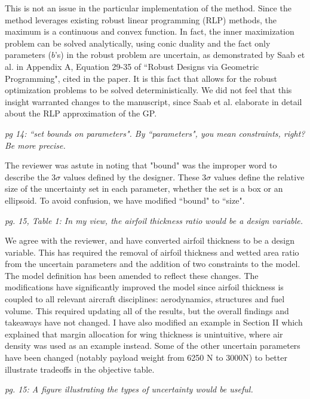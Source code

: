 \documentclass[11pt]{article}
\begin{document}
    This is not an issue in the particular implementation of the method.
    Since the method leverages existing robust linear programming (RLP)
    methods, the maximum is a continuous and convex function.
    In fact, the inner maximization problem can be solved analytically, using conic
    duality and the fact only parameters ($b$'s) in the robust problem are uncertain,
    as demonstrated by Saab et al. in Appendix A, Equation 29-35 of ``Robust Designs via Geometric Programming",
    cited in the paper.
    It is this fact that allows for the robust optimization problems to be solved deterministically.
    We did not feel that this insight warranted changes to the manuscript, since
    Saab et al. elaborate in detail about the RLP approximation of the GP.
    \bigskip

    \textit{pg 14: ``set bounds on parameters". By ``parameters", you mean constraints, right? Be more precise.}

    The reviewer was astute in noting that "bound" was the improper word to describe the $3\sigma$ values
    defined by the designer. These $3\sigma$ values define the relative size
    of the uncertainty set in each parameter, whether the set is a box or an ellipsoid.
    To avoid confusion, we have modified ``bound" to ``size".
    \bigskip

    \textit{pg. 15, Table 1: In my view, the airfoil thickness ratio would be a design variable.}

    We agree with the reviewer, and have converted airfoil thickness to be a design variable.
    This has required the removal of airfoil thickness and wetted area ratio from the uncertain parameters
    and the addition of two constraints to the model. The model definition has been
    amended to reflect these changes.
    The modifications have significantly improved the model since
    airfoil thickness is coupled to all relevant aircraft disciplines: aerodynamics, structures and
    fuel volume. This required updating all of the results,
    but the overall findings and takeaways have not changed. I have also
    modified an example in Section II
    which explained that margin allocation for wing thickness
    is unintuitive, where air density was used as an example instead.
    Some of the other uncertain parameters have been changed (notably
    payload weight from 6250 N to 3000N) to better illustrate tradeoffs in the objective
    table.
    \bigskip

    \textit{pg. 15: A figure illustrating the types of uncertainty would be useful.}
\end{document}
